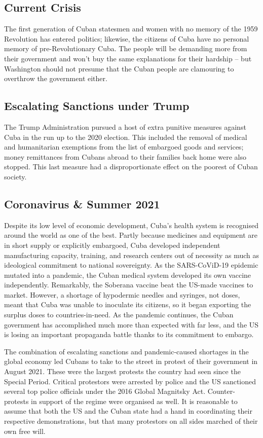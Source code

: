 \documentclass[letterpaper,12pt,twoside]{article} %
\begin{document}
\begin{multicols}{2}
\vfill
\pagebreak
\section{Current Crisis}

The first generation of Cuban statesmen and women with no memory of the 1959 Revolution has entered politics; likewise, the citizens of Cuba have no personal memory of pre-Revolutionary Cuba. The people will be demanding more from their government and won't buy the same explanations for their hardship -- but Washington should not presume that the Cuban people are clamouring to overthrow the government either.

\subsection*{Escalating Sanctions under Trump}

The Trump Administration pursued a host of extra punitive measures against Cuba in the run up to the 2020 election. This included the removal of medical and humanitarian exemptions from the list of embargoed goods and services; money remittances from Cubans abroad to their families back home were also stopped. This last measure had a disproportionate effect on the poorest of Cuban society.

\subsection*{Coronavirus \& Summer 2021}

Despite its low level of economic development, Cuba's health system is recognised around the world as one of the best. Partly because medicines and equipment are in short supply or explicitly embargoed, Cuba developed independent manufacturing capacity, training, and research centers out of necessity as much as ideological commitment to national sovereignty. As the SARS-CoViD-19 epidemic mutated into a pandemic, the Cuban medical system developed its own vaccine independently. Remarkably, the Soberana vaccine beat the US-made vaccines to market. However, a shortage of hypodermic needles and syringes, not doses, meant that Cuba was unable to inoculate its citizens, so it began exporting the surplus doses to countries-in-need. As the pandemic continues, the Cuban government has accomplished much more than expected with far less, and the US is losing an important propaganda battle thanks to its commitment to embargo.

The combination of escalating sanctions and pandemic-caused shortages in the global economy led Cubans to take to the street in protest of their government in August 2021. These were the largest protests the country had seen since the Special Period. Critical protestors were arrested by police and the US sanctioned several top police officials under the 2016 Global Magnitsky Act. Counter-protests in support of the regime were organised as well. It is reasonable to assume that both the US and the Cuban state had a hand in coordinating their respective demonstrations, but that many protestors on all sides marched of their own free will.


\end{multicols}
\end{document}
